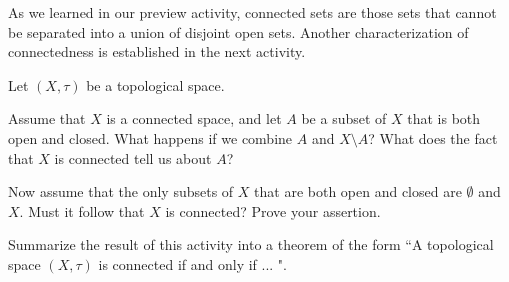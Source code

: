 \begin{comment}
\item Notice that $[1, 2] = (0, 2.5) \cap X$ and $(3, 4) = (3, 4) \cap X$, so both $[1, 2]$ and $(3, 4)$ are open in $X$. Then $X$ can be written as a disjoint union of nonempty proper open sets as $X = [1, 2] \cup (3, 4)$.

\begin{figure}[h]
\begin{center}
\resizebox{!}{2.5in}{\texttt{[image: PA\_18\_1.eps]}}
\caption{The set $O$.} 
\label{F:PA_18_1}
\end{center}
\end{figure}

\item  Let $Q_1 = \{(x, y) \ \mid| \  x > 0 \text{ and } y > 0\}$ and let $Q_4 = \{(x, y) \ \mid| \  x < 0 \text{ and } y < 0\}$. Then $Q_1$ and $Q_4$ are open sets in $\R^2$, so $O_1 = Q_1 \cap A$ and $O_2 = Q_4 \cap A$ are relatively open in $A$. Note that $O_1$ is the portion of the graph of $y = \frac{1}{x}$ in the first quadrant and $O_2$ is the portion of the graph of $y = \frac{1}{x}$ in the fourth quadrant. Now let 
\[O = \left\{(x,y) \mid |x| < 1 \text{ and } |y| < \frac{1}{4}, |x| \geq 1 \text{ and } y < \frac{1}{x^2}\right\}\]
as illustrated in Figure \ref{F:PA_18_1}. Note that $O \cap A$ is the line $y=0$. 

Now let $U = O_1 \cup O_2$ and $V = O \cap A$. Then $U$ and $V$ are nonempty open sets in $A$. Since all of the points in $V$ satisfy $y = 0$ and none of the points in $U$ have $y = 0$, we see that $U \cap V = \emptyset$. So $A$ is disconnected.


\ee

\end{comment}


\label{sec_connect_sets}

As we learned in our preview activity, connected sets are those sets that cannot be separated into a union of disjoint open sets. Another characterization of connectedness is established in the next activity.

\begin{activity} Let $(X, \tau)$ be a topological space.
\ba
\item Assume that $X$ is a connected space, and let $A$ be a subset of $X$ that is both open and closed. What happens if we combine $A$ and $X \setminus A$? What does the fact that $X$ is connected tell us about $A$?  

\item Now assume that the only subsets of $X$ that are both open and closed are $\emptyset$ and $X$. Must it follow that $X$ is connected? Prove your assertion. 

\item Summarize the result of this activity into a theorem of the form ``A topological space $(X, \tau)$ is connected if and only if ... ".

\ea
\end{activity} 

